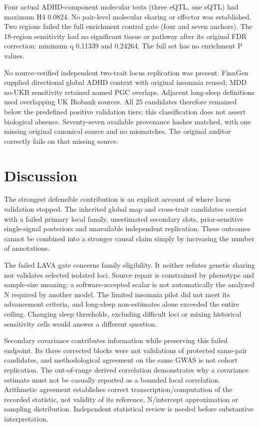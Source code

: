 \documentclass[11pt]{article}
\begin{document}
Four actual ADHD-component molecular tests (three eQTL, one sQTL) had maximum H4 0.0824. No pair-level molecular sharing or effector was established. Two regions failed the full enrichment control gate (four and seven anchors). The 18-region sensitivity had no significant tissue or pathway after its original FDR correction: minimum q 0.11339 and 0.24264. The full set has no enrichment P values.

No source-verified independent two-trait locus replication was present. FinnGen supplied directional global ADHD context with original insomnia reused; MDD no-UKB sensitivity retained named PGC overlaps. Adjacent long-sleep definitions used overlapping UK Biobank sources. All 25 candidates therefore remained below the predefined positive validation tiers; this classification does not assert biological absence. Seventy-seven available provenance hashes matched, with one missing original canonical source and no mismatches. The original auditor correctly fails on that missing source.

\section*{Discussion}
The strongest defensible contribution is an explicit account of where locus validation stopped. The inherited global map and cross-trait candidates coexist with a failed primary local family, unestimated secondary slots, prior-sensitive single-signal posteriors and unavailable independent replication. These outcomes cannot be combined into a stronger causal claim simply by increasing the number of annotations.

The failed LAVA gate concerns family eligibility. It neither refutes genetic sharing nor validates selected isolated loci. Source repair is constrained by phenotype and sample-size meaning: a software-accepted scalar is not automatically the analyzed N required by another model. The limited insomnia pilot did not meet its advancement criteria, and long-sleep non-estimates alone exceeded the entire ceiling. Changing sleep thresholds, excluding difficult loci or mixing historical sensitivity cells would answer a different question.

Secondary covariance contributes information while preserving this failed endpoint. Its three corrected blocks were not validations of protected same-pair candidates, and methodological agreement on the same GWAS is not cohort replication. The out-of-range derived correlation demonstrates why a covariance estimate must not be casually reported as a bounded local correlation. Arithmetic agreement establishes correct transcription/computation of the recorded statistic, not validity of its reference, N/intercept approximation or sampling distribution. Independent statistical review is needed before substantive interpretation.
\end{document}
